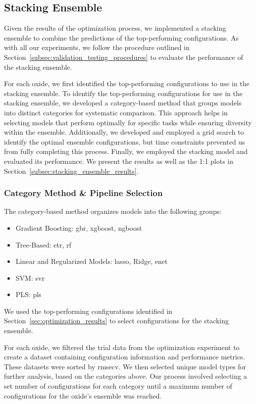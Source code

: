 \subsection{Stacking Ensemble}\label{subsec:stacking_ensemble}
Given the results of the optimization process, we implemented a stacking ensemble to combine the predictions of the top-performing configurations.
As with all our experiments, we follow the procedure outlined in Section~\ref{subsec:validation_testing_procedures} to evaluate the performance of the stacking ensemble.

For each oxide, we first identified the top-performing configurations to use in the stacking ensemble.
To identify the top-performing configurations for use in the stacking ensemble, we developed a category-based method that groups models into distinct categories for systematic comparison.
This approach helps in selecting models that perform optimally for specific tasks while ensuring diversity within the ensemble.
Additionally, we developed and employed a grid search to identify the optimal ensemble configurations, but time constraints prevented us from fully completing this process.
Finally, we employed the stacking model and evaluated its performance.
We present the results as well as the 1:1 plots in Section~\ref{subsec:stacking_ensemble_results}.

\subsubsection{Category Method \& Pipeline Selection}\label{subsec:category_method}
The category-based method organizes models into the following groups:

\begin{itemize}
    \item Gradient Boosting: \gls{gbr}, \gls{xgboost}, \gls{ngboost}
    \item Tree-Based: \gls{etr}, \gls{rf}
    \item Linear and Regularized Models: \gls{lasso}, Ridge, \gls{enet}
    \item SVM: \gls{svr}
    \item PLS: \gls{pls}
\end{itemize}

We used the top-performing configurations identified in Section~\ref{sec:optimization_results} to select configurations for the stacking ensemble.

For each oxide, we filtered the trial data from the optimization experiment to create a dataset containing configuration information and performance metrics.
These datasets were sorted by \gls{rmsecv}.
We then selected unique model types for further analysis, based on the categories above.
Our process involved selecting a set number of configurations for each category until a maximum number of configurations for the oxide's ensemble was reached.

